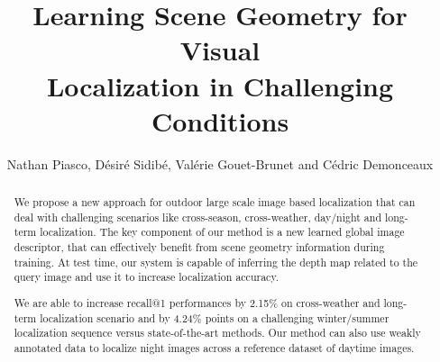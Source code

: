 \documentclass[letterpaper, 10 pt, conference]{ieeeconf}  %
\title{\LARGE \bf
Learning Scene Geometry for Visual\\Localization in Challenging Conditions
}
\author{Nathan Piasco, D\'esir\'e Sidib\'e, Val\'erie Gouet-Brunet and C\'edric Demonceaux}%
\begin{document}
\newcommand{\norm}[1]{\left\lVert#1\right\rVert}
\newcommand\numberthis{\addtocounter{equation}{1}\tag{\theequation}}

\maketitle
\thispagestyle{empty}
\pagestyle{empty}


\begin{abstract}
We propose a new approach for outdoor large scale image based localization that can deal with challenging scenarios like cross-season, cross-weather, day/night and long-term localization. The key component of our method is a new learned global image descriptor, that can effectively benefit from scene geometry information during training. At test time, our system is capable of inferring the depth map related to the query image and use it to increase localization accuracy.

We are able to increase recall@1 performances by 2.15\% on cross-weather and long-term localization scenario and by 4.24\% points on a challenging winter/summer localization sequence versus state-of-the-art methods. Our method can also use weakly annotated data to localize night images across a reference dataset of daytime images.
\end{abstract}






%



\end{document}

